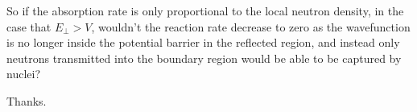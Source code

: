 \documentclass[11pt,a4paper,oneside]{article}
\begin{document}
So if the absorption rate is only proportional to the local neutron density, in the case that $E_{\perp} > V$, wouldn't the reaction rate decrease to zero as the wavefunction is no longer inside the potential barrier in the reflected region, and instead only neutrons transmitted into the boundary region would be able to be captured by nuclei?



Thanks.
\end{document}
